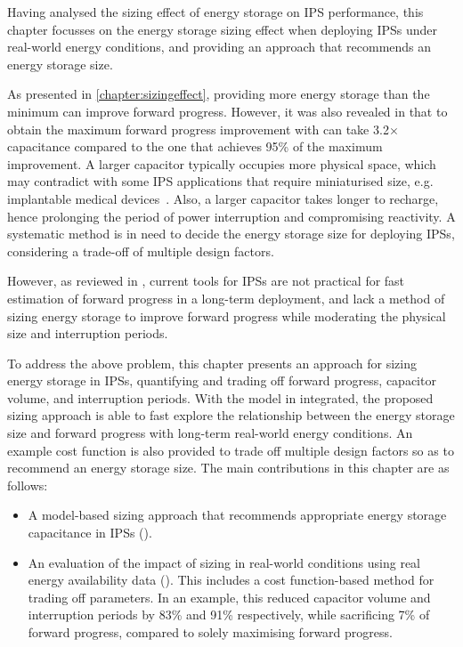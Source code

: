 Having analysed the sizing effect of energy storage on IPS performance, this chapter focusses on the energy storage sizing effect when deploying IPSs under real-world energy conditions, and providing an approach that recommends an energy storage size. 

As presented in \cref{chapter:sizingeffect}, providing more energy storage than the minimum can improve forward progress.
However, it was also revealed in  that to obtain the maximum forward progress improvement with  can take 3.2$\times$ capacitance compared to the one that achieves 95\% of the maximum improvement. 
A larger capacitor typically occupies more physical space, which may contradict with some IPS applications that require miniaturised size, e.g. implantable medical devices~\cite{amar2015power}.
Also, a larger capacitor takes longer to recharge, hence prolonging the period of power interruption and compromising reactivity. 
A systematic method is in need to decide the energy storage size for deploying IPSs, considering a trade-off of multiple design factors. 

However, as reviewed in , current tools for IPSs are not practical for fast estimation of forward progress in a long-term deployment, and lack a method of sizing energy storage to improve forward progress while moderating the physical size and interruption periods. 

To address the above problem, this chapter presents an approach for sizing energy storage in IPSs, quantifying and trading off forward progress, capacitor volume, and interruption periods. 
With the model in  integrated, the proposed sizing approach is able to fast explore the relationship between the energy storage size and forward progress with long-term real-world energy conditions. 
An example cost function is also provided to trade off multiple design factors so as to recommend an energy storage size. 
The main contributions in this chapter are as follows:
\begin{itemize}
    \item A model-based sizing approach that recommends appropriate energy storage capacitance in IPSs ().
    \item An evaluation of the impact of sizing in real-world conditions using real energy availability data (). 
    This includes a cost function-based method for trading off parameters. 
    In an example, this reduced capacitor volume and interruption periods by 83\% and 91\% respectively, while sacrificing 7\% of forward progress, compared to solely maximising forward progress.
\end{itemize}

